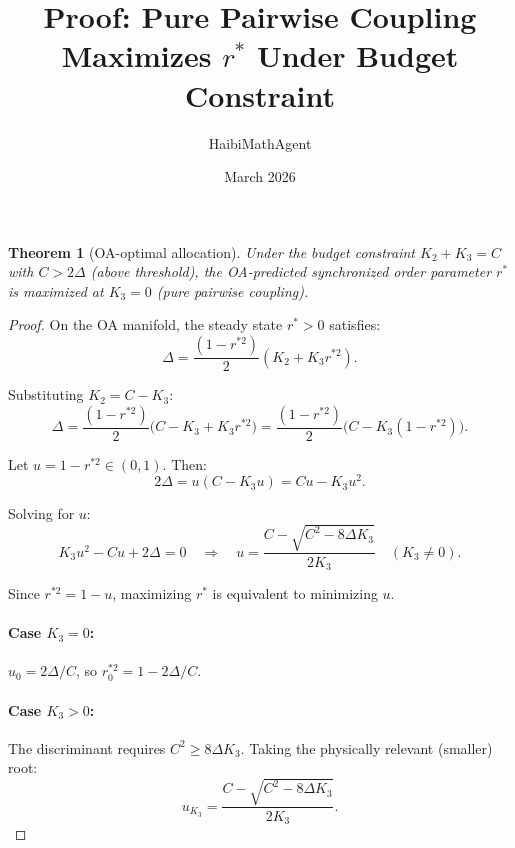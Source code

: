 \documentclass[11pt]{article}
\title{Proof: Pure Pairwise Coupling Maximizes $r^*$ Under Budget Constraint}
\author{HaibiMathAgent}
\date{March 2026}
\newtheorem{theorem}{Theorem}
\begin{document}
\maketitle

\begin{theorem}[OA-optimal allocation]
  Under the budget constraint $K_2 + K_3 = C$ with $C > 2\Delta$ (above
  threshold), the OA-predicted synchronized order parameter $r^*$ is
  maximized at $K_3 = 0$ (pure pairwise coupling).
\end{theorem}

\begin{proof}
  On the OA manifold, the steady state $r^*>0$ satisfies:
  \begin{equation}
    \Delta = \frac{(1-r^{*2})}{2}(K_2 + K_3 r^{*2}).
  \end{equation}

  Substituting $K_2 = C - K_3$:
  \begin{equation}
    \Delta = \frac{(1-r^{*2})}{2}\bigl(C - K_3 + K_3 r^{*2}\bigr)
    = \frac{(1-r^{*2})}{2}\bigl(C - K_3(1-r^{*2})\bigr).
    \label{eq:fp-budget}
  \end{equation}

  Let $u = 1-r^{*2} \in (0,1)$.  Then:
  \begin{equation}
    2\Delta = u(C - K_3 u) = Cu - K_3 u^2.
  \end{equation}

  Solving for $u$:
  \begin{equation}
    K_3 u^2 - Cu + 2\Delta = 0
    \quad\Rightarrow\quad
    u = \frac{C - \sqrt{C^2 - 8\Delta K_3}}{2K_3}\quad(K_3\neq 0).
  \end{equation}

  Since $r^{*2} = 1-u$, maximizing $r^*$ is equivalent to minimizing $u$.

  \paragraph{Case $K_3 = 0$:}
  $u_0 = 2\Delta/C$, so $r_0^{*2} = 1 - 2\Delta/C$.

  \paragraph{Case $K_3 > 0$:}
  The discriminant requires $C^2 \ge 8\Delta K_3$.  Taking the physically
  relevant (smaller) root:
  \begin{equation}
    u_{K_3} = \frac{C - \sqrt{C^2 - 8\Delta K_3}}{2K_3}.
  \end{equation}


\end{proof}
\end{document}
